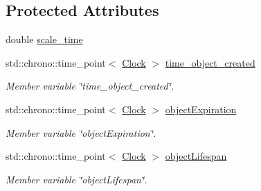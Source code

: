 \subsection*{Protected Attributes}
\begin{DoxyCompactItemize}
\item 
double \mbox{\hyperlink{class_dimension_ad3ba9c1c332756658b1e711c447831a3}{scale\+\_\+time}}
\item 
std\+::chrono\+::time\+\_\+point$<$ \mbox{\hyperlink{universe_8h_a0ef8d951d1ca5ab3cfaf7ab4c7a6fd80}{Clock}} $>$ \mbox{\hyperlink{class_dimension_a99ba1a7fe44c7e52520144ab4793cad3}{time\+\_\+object\+\_\+created}}
\begin{DoxyCompactList}\small\item\em Member variable \char`\"{}time\+\_\+object\+\_\+created\char`\"{}. \end{DoxyCompactList}\item 
std\+::chrono\+::time\+\_\+point$<$ \mbox{\hyperlink{universe_8h_a0ef8d951d1ca5ab3cfaf7ab4c7a6fd80}{Clock}} $>$ \mbox{\hyperlink{class_dimension_ac2df45c101a97359cfe179636f62b0f2}{object\+Expiration}}
\begin{DoxyCompactList}\small\item\em Member variable \char`\"{}object\+Expiration\char`\"{}. \end{DoxyCompactList}\item 
std\+::chrono\+::time\+\_\+point$<$ \mbox{\hyperlink{universe_8h_a0ef8d951d1ca5ab3cfaf7ab4c7a6fd80}{Clock}} $>$ \mbox{\hyperlink{class_dimension_a249074ae65a06cb5386baf196bdee022}{object\+Lifespan}}
\begin{DoxyCompactList}\small\item\em Member variable \char`\"{}object\+Lifespan\char`\"{}. \end{DoxyCompactList}\end{DoxyCompactItemize}
